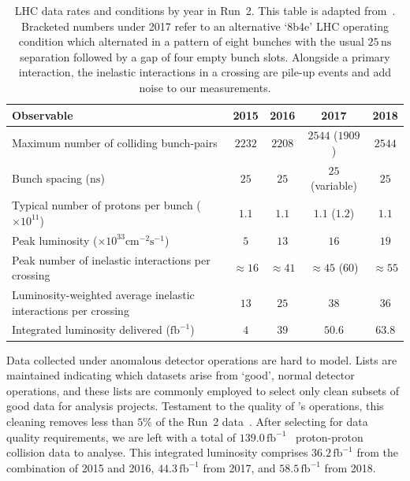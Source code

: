 \begin{table}
\centering
\begin{tabular}{lcccc}
Observable                                                        & 2015         & 2016         & 2017                & 2018         \\
\hline
Maximum number of colliding bunch-pairs                           & $2232$       & $2208$       & $2544$ ($1909$)     & $2544$       \\
Bunch spacing ($\mathrm{ns}$)                                     & $25$         & $25$         & $25$ (variable)          & $25$         \\
Typical number of protons per bunch ($\times 10^{11}$)            & $1.1$        & $1.1$        & $1.1$ ($1.2$)       & $1.1$        \\
Peak luminosity ($\times 10^{33}\mathrm{cm}^{-2}\mathrm{s}^{-1}$) & $5$          & $13$         & $16$                & $19$         \\
Peak number of inelastic interactions per crossing                & $\approx 16$ & $\approx 41$ & $\approx 45$ ($60$) & $\approx 55$ \\
Luminosity-weighted average inelastic interactions per crossing   & $13$         & $25$         & $38$                & $36$         \\
Integrated luminosity delivered ($\mathrm{fb}^{-1}$)              & $4$          & $39$         & $50.6$              & $63.8$
\end{tabular}
\caption[
LHC data rates and conditions by year in Run~2
]{%
LHC data rates and conditions by year in Run~2.
This table is adapted from~\cite{ATLAS:2022hro}.
Bracketed numbers under 2017 refer to an alternative `8b4e' LHC operating
condition which alternated in a pattern of eight bunches with the usual
$25\,\mathrm{ns}$ separation followed by a gap of four empty bunch slots.
Alongside a primary interaction, the inelastic interactions in a crossing are
pile-up events and add noise to our measurements.
}
\label{tab:experiment_run2_state}
\end{table}

Data collected under anomalous detector operations are hard to model.
Lists are maintained indicating which datasets arise from `good', normal
detector operations, and these lists are commonly employed to select only clean
subsets of good data for analysis projects.
Testament to the quality of \atlas's operations, this cleaning removes less
than $5\%$ of the Run~2 data~\cite{
DAPR-2018-01,
Golling:2011zy
}.
After selecting for data quality requirements, we are left with a total of
$139.0\,\mathrm{fb}^{-1}$ \atlas\ proton-proton collision data to analyse.
This integrated luminosity comprises
$36.2\,\mathrm{fb}^{-1}$ from the combination of 2015 and 2016,
$44.3\,\mathrm{fb}^{-1}$ from 2017, and
$58.5\,\mathrm{fb}^{-1}$ from 2018.


